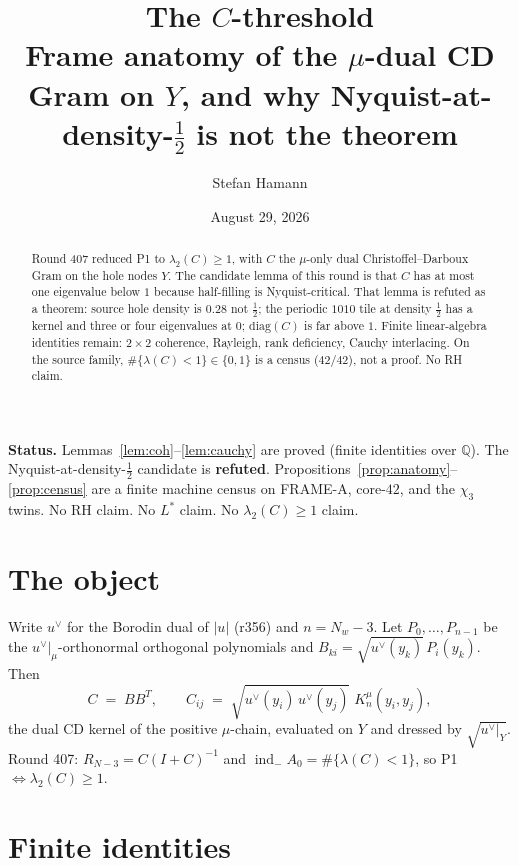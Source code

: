 \documentclass[11pt]{article}
\title{\bfseries The $C$-threshold\\[2mm]
\large Frame anatomy of the $\mu$-dual CD Gram on $Y$, and
why Nyquist-at-density-$\tfrac12$ is not the theorem}
\author{Stefan Hamann}
\date{August 29, 2026}
\theoremstyle{remark}
\newcommand{\indm}{\operatorname{ind}_{-}}
\begin{document}
\maketitle

\begin{abstract}\noindent
Round 407 reduced P1 to $\lambda_2(C)\ge 1$, with $C$ the
$\mu$-only dual Christoffel--Darboux Gram on the hole nodes
$Y$.
The candidate lemma of this round is that $C$ has at most one
eigenvalue below $1$ because half-filling is Nyquist-critical.
That lemma is refuted as a theorem: source hole density is
$0.28$ not $\tfrac12$; the periodic $1010$ tile at density
$\tfrac12$ has a kernel and three or four eigenvalues at $0$;
$\mathrm{diag}(C)$ is far above $1$.
Finite linear-algebra identities remain: $2\times 2$ coherence,
Rayleigh, rank deficiency, Cauchy interlacing.
On the source family, $\#\{\lambda(C)<1\}\in\{0,1\}$ is a
census ($42/42$), not a proof.
No RH claim.
\end{abstract}

\medskip\noindent
\textbf{Status.}\enspace
Lemmas~\ref{lem:coh}--\ref{lem:cauchy} are proved (finite
identities over $\mathbb{Q}$).
The Nyquist-at-density-$\tfrac12$ candidate is
\textbf{refuted}.
Propositions~\ref{prop:anatomy}--\ref{prop:census} are a
finite machine census on FRAME-A, core-$42$, and the
$\chi_3$ twins.
No RH claim.  No $L^*$ claim.  No $\lambda_2(C)\ge 1$ claim.

\section{The object}\label{sec:obj}

Write $u^\vee$ for the Borodin dual of $|u|$ (r356) and
$n=N_w-3$.
Let $P_0,\dots,P_{n-1}$ be the $u^\vee|_\mu$-orthonormal
orthogonal polynomials and $B_{ki}=\sqrt{u^\vee(y_k)}\,P_i(y_k)$.
Then
\begin{equation}\label{eq:C}
  C \;=\; BB^T,
  \qquad
  C_{ij}
  \;=\;
  \sqrt{u^\vee(y_i)\,u^\vee(y_j)}\;
  K_n^\mu(y_i,y_j),
\end{equation}
the dual CD kernel of the positive $\mu$-chain, evaluated on
$Y$ and dressed by $\sqrt{u^\vee|_Y}$.
Round 407: $R_{N-3}=C(I+C)^{-1}$ and
$\indm A_0=\#\{\lambda(C)<1\}$, so P1 $\iff\lambda_2(C)\ge 1$.

\section{Finite identities}\label{sec:satz}
\end{document}

